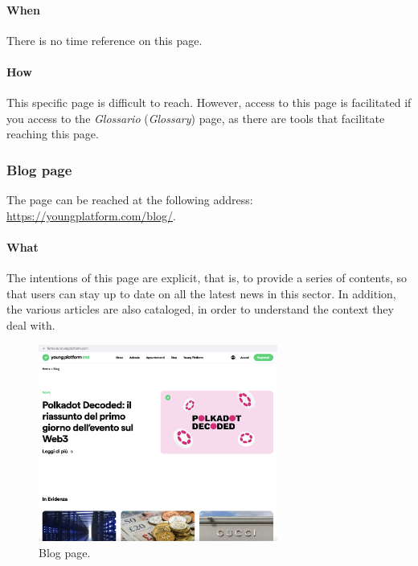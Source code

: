 \paragraph{When}

There is no time reference on this page.

\paragraph{How}

This specific page is difficult to reach. However, access to this page is 
facilitated if you access to the \textit{Glossario} (\textit{Glossary}) 
page, as there are tools that facilitate reaching this page.

\subsubsection{Blog page}

The page can be reached at the following address: 
\href{https://youngplatform.com/blog/}{https://youngplatform.com/blog/}.

\paragraph{What}

The intentions of this page are explicit, that is, to provide a series of 
contents, so that users can stay up to date on all the latest news in this 
sector. In addition, the various articles are also cataloged, in order to 
understand the context they deal with.

\begin{figure}[H]
  \centering
  \includegraphics[width=0.70\textwidth]{res/images/internal-pages/blog/blog-1.png}
  \caption{Blog page.}
  \label{fig:blog-1}
\end{figure}


